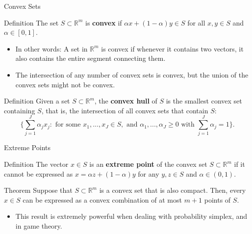 \documentclass{beamer}
\begin{document}
\begin{frame}{Convex Sets}
    \begin{block}{Definition}
    The set $S\subset \mathbb{R}^m$ is \textbf{convex} if $\alpha x+(1-\alpha)y\in S$ for all $x, y\in S$ and $\alpha\in [0,1]$. 
    
    \end{block}
    \begin{itemize}
        \item In other words: A set in $\mathbb{R}^m$ is convex if whenever it contains two vectors, it also contains the entire segment connecting them. 
        \item The intersection of any number of convex sets is convex, but the union of the convex sets might not be convex. 
        
    \end{itemize}
    \begin{block}{Definition}
    Given a set  $S\subset \mathbb{R}^m$, the \textbf{convex hull} of $S$ is the smallest convex set containing $S$, that is, the intersection of all convex sets that contain $S$:
    \[\{\sum_{j=1}^J\alpha_j x_j: \text{ for some } x_1,..., x_J\in S, \text{ and }\alpha_1,..., \alpha_J\geq 0 \text{ with } \sum_{j=1}^J\alpha_j=1\}.
    \]
    \end{block}
\end{frame}
\begin{frame}{Extreme Points}
    \begin{block}{Definition}
    The vector $x\in S$ is an \textbf{extreme point} of the convex set $S\subset \mathbb{R}^m$ if it cannot be expressed as $x=\alpha z+(1-\alpha)y$ for any $y,z\in S$ and $\alpha\in (0,1)$.
    \end{block}
    \begin{block}{Theorem}
    Suppose that $S\subset \mathbb{R}^m$ is a convex set that is also compact. Then, every $x\in S$ can be expressed as a convex combination of at most $m+1$ points of $S$.
    \end{block}
    \begin{itemize}
        \item This result is extremely powerful when dealing with probability simplex, and in game theory.
    \end{itemize}
\end{frame}
\end{document}
